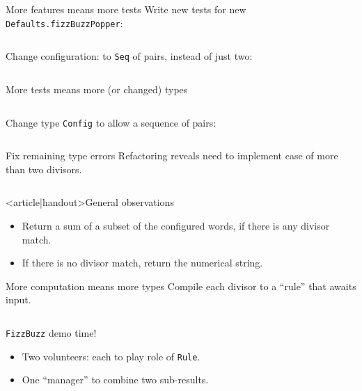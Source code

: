 \begin{frame}[fragile]{More features means more tests}
  Write new tests for new \texttt{Defaults.fizzBuzzPopper}:

  \inputminted[gobble=2]{scala}{FizzBuzzSpec5.scala}

  Change configuration: to \texttt{Seq} of pairs, instead of just two:
  \inputminted[gobble=2]{scala}{Defaults2.scala}
\end{frame}

\begin{frame}[fragile]{More tests means more (or changed) types}
  \inputminted{console}{testQuick8.console}

  Change \alert{type} \texttt{Config} to allow a sequence of pairs:

  \inputminted[gobble=2]{scala}{FizzBuzz3Seq.scala}

\end{frame}

\begin{frame}[fragile]{Fix remaining type errors}
  Refactoring reveals need to implement case of more than two divisors.

  \inputminted[gobble=2]{scala}{FizzBuzz3SeqCompile.scala}
\end{frame}

\begin{frame}<article|handout>{General observations}
  \begin{itemize}
  \item Return a sum of a subset of the configured words, if there is any divisor match.
  \item If there is \alert{no} divisor match, return the numerical string.
  \end{itemize}
\end{frame}

\begin{frame}[fragile]{More computation means more types}
  Compile each divisor to a ``rule'' that awaits input.

  \inputminted[gobble=2]{scala}{FizzBuzz4.scala}

  \begin{block}{\texttt{FizzBuzz} demo time!}
    \begin{itemize}
    \item Two volunteers: each to play role of \texttt{Rule}.
    \item One ``manager'' to combine two sub-results.
    \end{itemize}
  \end{block}
\end{frame}

